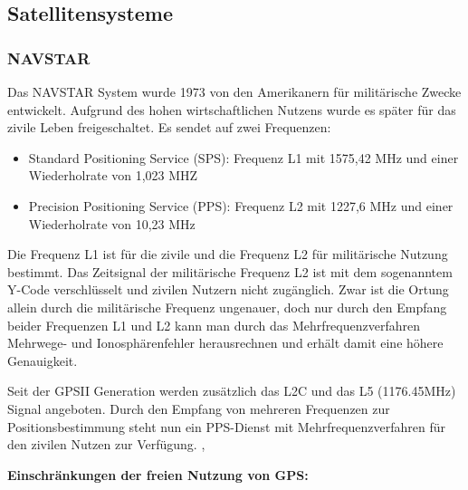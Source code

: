 \documentclass[letterpaper,11pt,ngerman]{andi}
\begin{document}
\subsection{Satellitensysteme}
\label{included_projects/gps/GPS_SPEC/content:satellitensysteme}

\subsubsection{NAVSTAR}
\label{included_projects/gps/GPS_SPEC/content:navstar}
Das NAVSTAR System wurde 1973 von den Amerikanern für militärische Zwecke entwickelt. Aufgrund des hohen wirtschaftlichen Nutzens wurde es später für das zivile Leben freigeschaltet. Es sendet auf zwei Frequenzen:
\begin{itemize}
\item {} 
Standard Positioning Service (SPS): Frequenz L1 mit 1575,42 MHz und einer Wiederholrate von 1,023 MHZ

\item {} 
Precision Positioning Service (PPS): Frequenz L2 mit 1227,6 MHz und einer Wiederholrate von 10,23 MHz

\end{itemize}

Die Frequenz L1 ist für die zivile und die Frequenz L2 für militärische Nutzung bestimmt. \cite{sat_nav_dodel} Das Zeitsignal der militärische Frequenz L2 ist mit dem sogenanntem Y-Code verschlüsselt und zivilen Nutzern nicht zugänglich. \cite{sat_nav_thaller} Zwar ist die Ortung allein durch die militärische Frequenz ungenauer, doch nur durch den Empfang beider Frequenzen L1 und L2 kann man durch das Mehrfrequenzverfahren Mehrwege- und Ionosphärenfehler herausrechnen und erhält damit eine höhere Genauigkeit. \cite{sat_nav_dodel}

Seit der GPSII Generation werden zusätzlich das L2C und das L5 (1176.45MHz) Signal angeboten. Durch den Empfang von mehreren Frequenzen zur Positionsbestimmung steht nun ein PPS-Dienst mit Mehrfrequenzverfahren für den zivilen Nutzen zur Verfügung. \cite{sat_nav_dodel}, \cite{gps_world}

\textbf{Einschränkungen der freien Nutzung von GPS:}
\end{document}
